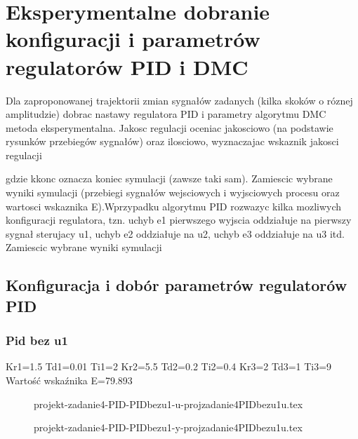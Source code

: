 \section{Eksperymentalne dobranie konfiguracji i parametrów regulatorów PID i DMC}
\label{projekt:zad4}

Dla zaproponowanej trajektorii zmian sygnałów zadanych (kilka skoków o róznej amplitudzie)
dobrac nastawy regulatora PID i parametry algorytmu DMC metoda eksperymentalna.
Jakosc regulacji oceniac jakosciowo (na podstawie rysunków przebiegów
sygnałów) oraz ilosciowo, wyznaczajac wskaznik jakosci regulacji

gdzie kkonc oznacza koniec symulacji (zawsze taki sam). Zamiescic wybrane wyniki symulacji
(przebiegi sygnałów wejsciowych i wyjsciowych procesu oraz wartosci wskaznika
E).Wprzypadku algorytmu PID rozwazyc kilka mozliwych konfiguracji regulatora,
tzn. uchyb e1 pierwszego wyjscia oddziałuje na pierwszy sygnał sterujacy u1, uchyb
e2 oddziałuje na u2, uchyb e3 oddziałuje na u3 itd. Zamiescic wybrane wyniki symulacji

\subsection{Konfiguracja i dobór parametrów regulatorów PID}

\subsubsection{Pid bez u1}

Kr1=1.5 Td1=0.01 Ti1=2 Kr2=5.5 Td2=0.2 Ti2=0.4 Kr3=2 Td3=1 Ti3=9
Wartość wskaźnika E=79.893

\ifdefined\CompileFigures
    \begin{figure}[H] 
        \centering
        
        \caption{projekt-zadanie4-PID-PIDbezu1-u-projzadanie4PIDbezu1u.tex}
        \label{projekt:zad4:figure:uprojzadanie4PIDbezu1u}
    \end{figure}
\fi

\ifdefined\CompileFigures
    \begin{figure}[H] 
        \centering
        
        \caption{projekt-zadanie4-PID-PIDbezu1-y-projzadanie4PIDbezu1u.tex}
        \label{projekt:zad4:figure:yprojzadanie4PIDbezu1u}
    \end{figure}
\fi

